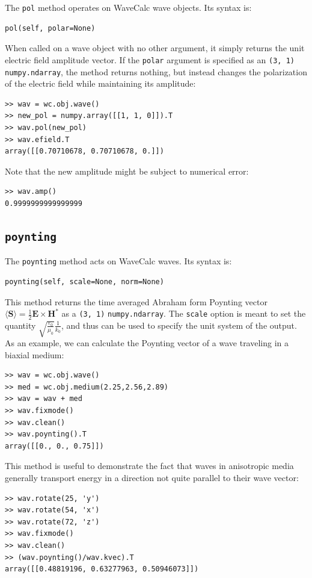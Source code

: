 \documentclass[11pt, reqno]{book}%
\newcounter{ct}
\newcommand{\mbf}{\mathbf}
\newcommand{\ve}{\varepsilon}
\newcommand{\tw}[1]{{\tt #1}}
\begin{document}
The \tw{pol} method operates on WaveCalc wave objects. Its syntax is:
\begin{verbatim}
pol(self, polar=None)
\end{verbatim}
\noindent When called on a wave object with no other argument, it simply returns the unit electric field amplitude vector. If the \tw{polar} argument is specified as an \tw{(3, 1)} \tw{numpy.ndarray}, the method returns nothing, but instead changes the polarization of the electric field while maintaining its amplitude:
\begin{verbatim}
>> wav = wc.obj.wave()
>> new_pol = numpy.array([[1, 1, 0]]).T
>> wav.pol(new_pol)
>> wav.efield.T
array([[0.70710678, 0.70710678, 0.]])
\end{verbatim}
\noindent Note that the new amplitude might be subject to numerical error:
\begin{verbatim}
>> wav.amp()
0.9999999999999999
\end{verbatim}














\subsection{\tw{poynting}}
\label{sec:poyntingmethod}

The \tw{poynting} method acts on WaveCalc waves. Its syntax is:
\begin{verbatim}
poynting(self, scale=None, norm=None)
\end{verbatim}
This method returns the time averaged Abraham form Poynting vector $\langle\mbf{S}\rangle =\frac{1}{2} \mbf{E}\times\mbf{H}^{*}$ as a \tw{(3, 1)} \tw{numpy.ndarray}. The \tw{scale} option is meant to set the quantity $\sqrt{\frac{\ve_0}{\mu_0}}\frac{1}{k_0}$, and thus can be used to specify the unit system of the output. As an example, we can calculate the Poynting vector of a wave traveling in a biaxial medium:
\begin{verbatim}
>> wav = wc.obj.wave()
>> med = wc.obj.medium(2.25,2.56,2.89)
>> wav = wav + med
>> wav.fixmode()
>> wav.clean()
>> wav.poynting().T
array([[0., 0., 0.75]])
\end{verbatim}
\noindent This method is useful to demonstrate the fact that waves in anisotropic media generally transport energy in a direction not quite parallel to their wave vector:
\begin{verbatim}
>> wav.rotate(25, 'y')
>> wav.rotate(54, 'x')
>> wav.rotate(72, 'z')
>> wav.fixmode()
>> wav.clean()
>> (wav.poynting()/wav.kvec).T
array([[0.48819196, 0.63277963, 0.50946073]])
\end{verbatim}
\end{document}

